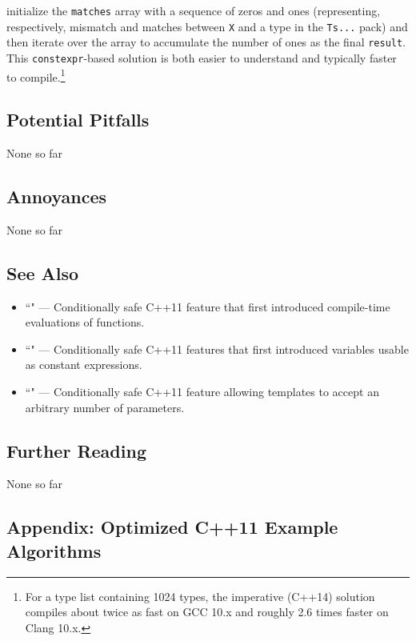 initialize the \texttt{matches} array with a sequence of zeros and ones
(representing, respectively, mismatch and matches between \texttt{X} and
a type in the \texttt{Ts...} pack) and then iterate over the array to
accumulate the number of ones as the final \texttt{result}. This
\texttt{constexpr}-based solution is both easier to understand and
typically faster to compile.{\cprotect\footnote{For a type list
containing 1024 types, the imperative (C++14) solution compiles about
twice as fast on GCC 10.x and roughly 2.6 times faster on Clang
10.x.}}

\subsection[Potential Pitfalls]{Potential Pitfalls}\label{potential-pitfalls}

None so far

\subsection[Annoyances]{Annoyances}\label{annoyances}

None so far

\subsection[See Also]{See Also}\label{see-also}

\begin{itemize}
\item{``" — Conditionally safe C++11 feature that first introduced compile-time evaluations of functions.}
\item{``" — Conditionally safe C++11 features that first introduced variables usable as constant expressions.}
\item{``" — Conditionally safe C++11 feature allowing templates to accept an arbitrary number of parameters.}
\end{itemize}

\subsection[Further Reading]{Further Reading}\label{further-reading}

None so far

\subsection[Appendix: Optimized C++11 Example Algorithms]{Appendix: Optimized C++11 Example Algorithms}\label{appendix:-optimized-c++11-example-algorithms}

